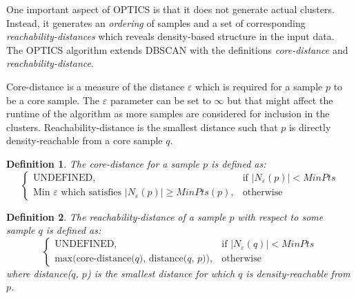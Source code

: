 \documentclass[a4paper]{report}
\newtheorem*{definition}{Definition}
\begin{document}
One important aspect of OPTICS is that it does not generate actual clusters.
Instead, it generates an \emph{ordering} of samples and a set of corresponding
\emph{reachability-distances} which reveals density-based structure in the
input data. The OPTICS algorithm extends DBSCAN with the definitions
\emph{core-distance} and \emph{reachability-distance}.

Core-distance is a measure of the distance $\varepsilon$ which is required
for a sample $p$ to be a core sample. The $\varepsilon$ parameter can be set to
$\infty$ but that might affect the runtime of the algorithm as more samples are
considered for inclusion in the clusters. Reachability-distance is the smallest
distance such that $p$ is directly density-reachable from a core sample $q$.

\begin{definition}
    The core-distance for a sample $p$ is defined as:
\[
    \begin{cases}
        \text{UNDEFINED}, & \text{if $|N_{\varepsilon}(p)| < MinPts$}\\
        \text{Min $\varepsilon$ which satisfies $|N_{\varepsilon}(p)| \ge
        MinPts$}(p), & \text{otherwise}
    \end{cases}
\]
\end{definition}

\begin{definition}
    The reachability-distance of a sample $p$ with respect to some sample $q$
    is defined as:
\[
    \begin{cases}
        \text{UNDEFINED}, & \text{if $|N_{\varepsilon}(q)| < MinPts$}\\
        \text{max(core-distance($q$), distance($q$, $p$))}, & \text{otherwise}
    \end{cases}
\]
    where distance($q$, $p$) is the smallest distance for which $q$ is
    density-reachable from $p$.
\end{definition}
\end{document}
